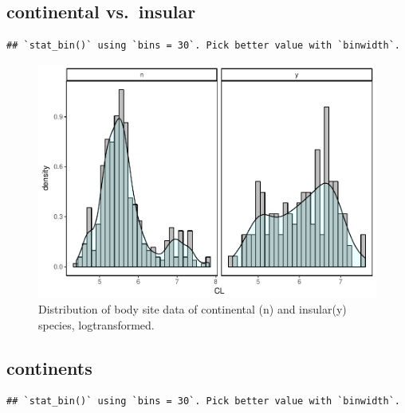 \documentclass[]{article}
\begin{document}
\newpage

\subsection{continental vs.~insular}\label{continental-vs.insular}

\begin{verbatim}
## `stat_bin()` using `bins = 30`. Pick better value with `binwidth`.
\end{verbatim}

\begin{figure}[htbp]
\centering
\includegraphics{MA_JJ_files/figure-latex/Histograms of body size data, continental vs. insular-1.pdf}
\caption{Distribution of body site data of continental (n) and
insular(y) species, logtransformed.}
\end{figure}

\newpage

\subsection{continents}\label{continents}

\begin{verbatim}
## `stat_bin()` using `bins = 30`. Pick better value with `binwidth`.
\end{verbatim}
\end{document}
